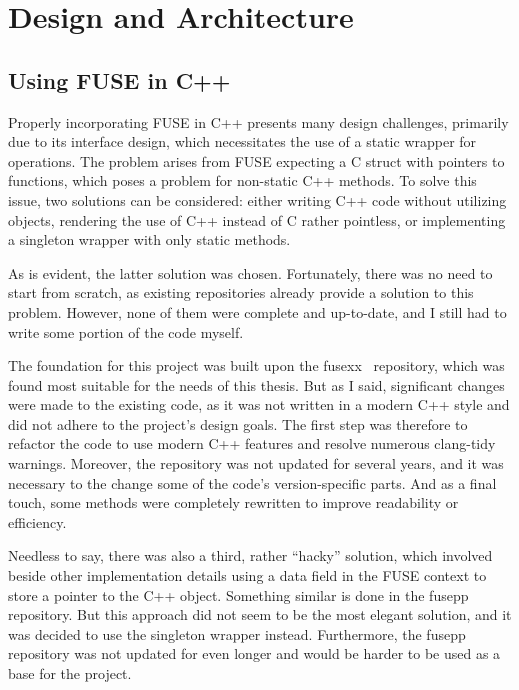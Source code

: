 \chapter{Design and Architecture}
\label{chap:design-and-architecture}


\section{Using FUSE in C++}\label{sec:fuse-in-cpp}

Properly incorporating FUSE in C++ presents many design challenges, primarily due to its interface design, which necessitates the use of a static wrapper for operations.
The problem arises from FUSE expecting a C struct with pointers to functions, which poses a problem for non-static C++ methods.
To solve this issue, two solutions can be considered: either writing C++ code without utilizing objects, rendering the use of C++ instead of C rather pointless, or implementing a singleton wrapper with only static methods.

As is evident, the latter solution was chosen.
Fortunately, there was no need to start from scratch, as existing repositories already provide a solution to this problem.
However, none of them were complete and up-to-date, and I still had to write some portion of the code myself.

The foundation for this project was built upon the fusexx~\cite{fusexx} repository, which was found most suitable for the needs of this thesis.
But as I said, significant changes were made to the existing code, as it was not written in a modern C++ style and did not adhere to the project's design goals.
The first step was therefore to refactor the code to use modern C++ features and resolve numerous clang-tidy warnings.
Moreover, the repository was not updated for several years, and it was necessary to the change some of the code's version-specific parts.
And as a final touch, some methods were completely rewritten to improve readability or efficiency.

Needless to say, there was also a third, rather ``hacky'' solution, which involved beside other implementation details using a data field in the FUSE context to store a pointer to the C++ object.
Something similar is done in the fusepp~\cite{fusepp} repository.
But this approach did not seem to be the most elegant solution, and it was decided to use the singleton wrapper instead.
Furthermore, the fusepp repository was not updated for even longer and would be harder to be used as a base for the project.


